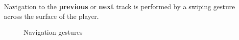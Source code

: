 \documentclass[12pt,letterpaper]{article}
\begin{document}
Navigation to the \textbf{previous} or \textbf{next} track is performed by a swiping gesture across the surface of the player.
	\begin{figure}[H]
		\centering
		\hspace{1in}
		\caption{Navigation gestures}
	\end{figure}
\end{document}
